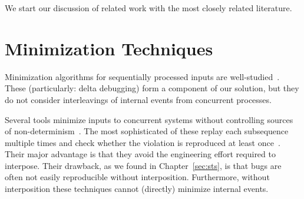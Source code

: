 %



We start our discussion of related work with the most closely
related literature.

\section{Minimization Techniques}

 Minimization
algorithms for sequentially processed inputs are
well-studied~\cite{Zeller:2002:SIF:506201.506206,claessen2000quickcheck,regehr2012test,whitaker2004configuration,burger2011minimizing,fse_web_ddmin,chang2007simulation}.
These (particularly: delta debugging) form a component of our solution, but they do not consider
interleavings of internal events from concurrent processes.

 Several
tools minimize inputs to concurrent
systems without controlling sources of non-determinism~\cite{arts2006testing,clause2007technique,tucek2007triage,jin2013f3,hughes2011testing}.
The most sophisticated of these replay each subsequence
multiple times and check whether the violation is reproduced at least once~\cite{hughes2011testing,claessen2009finding}.
Their major advantage is that they avoid the engineering effort required to
interpose. Their drawback, as we found in Chapter~\ref{sec:sts},
 is that bugs are often not easily reproducible without
interposition. Furthermore, without interposition these techniques cannot
(directly) minimize internal events.

